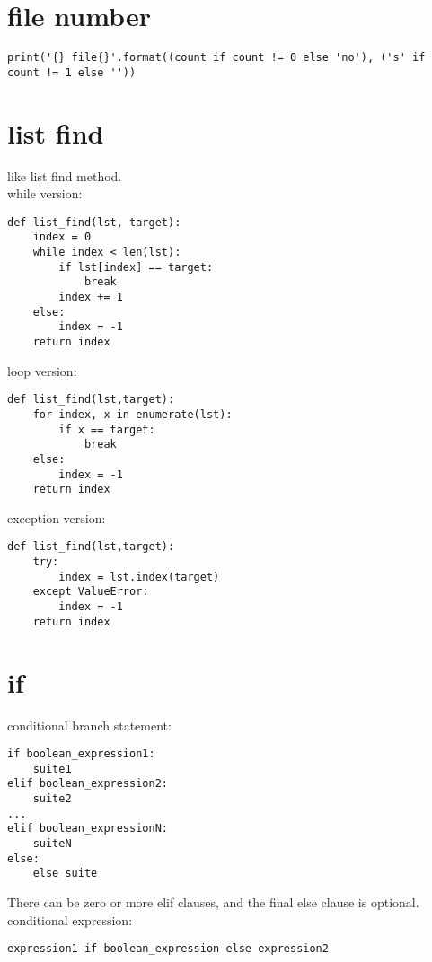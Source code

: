 \documentclass[11pt]{article}
\begin{document}
\section{file number}
\label{sec-20}
\begin{verbatim}
print('{} file{}'.format((count if count != 0 else 'no'), ('s' if count != 1 else ''))
\end{verbatim}

\section{list find}
\label{sec-21}
like list find method. \\

while version: \\
\begin{verbatim}
def list_find(lst, target):
    index = 0
    while index < len(lst):
        if lst[index] == target:
            break
        index += 1
    else:
        index = -1
    return index
\end{verbatim}

loop version: \\
\begin{verbatim}
def list_find(lst,target):
    for index, x in enumerate(lst):
        if x == target:
            break
    else:
        index = -1
    return index
\end{verbatim}

exception version: \\
\begin{verbatim}
def list_find(lst,target):
    try:
        index = lst.index(target)
    except ValueError:
        index = -1
    return index
\end{verbatim}

\section{if}
\label{sec-22}
conditional branch statement: \\
\begin{verbatim}
if boolean_expression1:
    suite1
elif boolean_expression2:
    suite2
...
elif boolean_expressionN:
    suiteN
else:
    else_suite
\end{verbatim}
There can be zero or more elif clauses, and the final else clause is optional. \\

conditional expression: \\
\begin{verbatim}
expression1 if boolean_expression else expression2
\end{verbatim}
\end{document}
